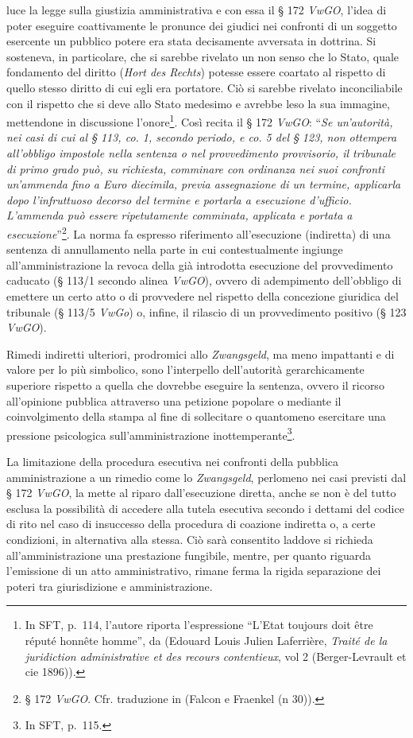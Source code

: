 \documentclass[12pt,it,a4paper,]{report}
\begin{document}
luce la legge sulla giustizia amministrativa e con essa il § 172
\emph{VwGO}, l'idea di poter eseguire coattivamente le pronunce dei
giudici nei confronti di un soggetto esercente un pubblico potere era
stata decisamente avversata in dottrina. Si sosteneva, in particolare,
che si sarebbe rivelato un non senso che lo Stato, quale fondamento del
diritto (\emph{Hort des Rechts}) potesse essere coartato al rispetto di
quello stesso diritto di cui egli era portatore. Ciò si sarebbe rivelato
inconciliabile con il rispetto che si deve allo Stato medesimo e avrebbe
leso la sua immagine, mettendone in discussione l'onore\footnote{In SFT,
  p.~114, l'autore riporta l'espressione ``L'Etat toujours doit être
  réputé honnête homme'', da (Edouard Louis Julien Laferrière,
  \emph{Traité de la juridiction administrative et des recours
  contentieux}, vol 2 (Berger-Levrault et cie 1896)).}. Così recita il §
172 \emph{VwGO}: ``\emph{Se un'autorità, nei casi di cui al § 113, co.
1, secondo periodo, e co. 5 del § 123, non ottempera all'obbligo
impostole nella sentenza o nel provvedimento provvisorio, il tribunale
di primo grado può, su richiesta, comminare con ordinanza nei suoi
confronti un'ammenda fino a Euro diecimila, previa assegnazione di un
termine, applicarla dopo l'infruttuoso decorso del termine e portarla a
esecuzione d'ufficio. L'ammenda può essere ripetutamente comminata,
applicata e portata a esecuzione}''\footnote{§ 172 \emph{VwGO}. Cfr.
  traduzione in (Falcon e Fraenkel (n 30)).}. La norma fa espresso
riferimento all'esecuzione (indiretta) di una sentenza di annullamento
nella parte in cui contestualmente ingiunge all'amministrazione la
revoca della già introdotta esecuzione del provvedimento caducato (§
113/1 secondo alinea \emph{VwGO}), ovvero di adempimento dell'obbligo di
emettere un certo atto o di provvedere nel rispetto della concezione
giuridica del tribunale (§ 113/5 \emph{VwGo}) o, infine, il rilascio di
un provvedimento positivo (§ 123 \emph{VwGO}).

Rimedi indiretti ulteriori, prodromici allo \emph{Zwangsgeld}, ma meno
impattanti e di valore per lo più simbolico, sono l'interpello
dell'autorità gerarchicamente superiore rispetto a quella che dovrebbe
eseguire la sentenza, ovvero il ricorso all'opinione pubblica attraverso
una petizione popolare o mediante il coinvolgimento della stampa al fine
di sollecitare o quantomeno esercitare una pressione psicologica
sull'amministrazione inottemperante\footnote{In SFT, p.~115.}.

La limitazione della procedura esecutiva nei confronti della pubblica
amministrazione a un rimedio come lo \emph{Zwangsgeld}, perlomeno nei
casi previsti dal § 172 \emph{VwGO}, la mette al riparo dall'esecuzione
diretta, anche se non è del tutto esclusa la possibilità di accedere
alla tutela esecutiva secondo i dettami del codice di rito nel caso di
insuccesso della procedura di coazione indiretta o, a certe condizioni,
in alternativa alla stessa. Ciò sarà consentito laddove si richieda
all'amministrazione una prestazione fungibile, mentre, per quanto
riguarda l'emissione di un atto amministrativo, rimane ferma la rigida
separazione dei poteri tra giurisdizione e amministrazione.
\end{document}
